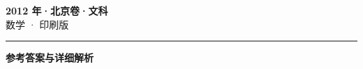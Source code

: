\documentclass[zihao=5, a4paper]{ctexart}
\begin{document}
\begin{center}
  {\Large\bfseries 2012 年·北京卷·文科}\\[4pt]
  {\large 数学 · 印刷版}
\end{center}
\medskip
{}

\par\bigskip\hrule\bigskip
{}
\begin{center}{\large\bfseries 参考答案与详细解析}\end{center}
\smallskip

\end{document}
